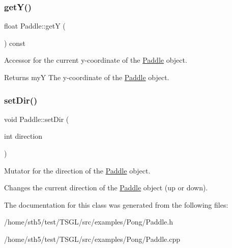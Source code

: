 \subsubsection{\texorpdfstring{get\+Y()}{getY()}}
{\footnotesize\ttfamily float Paddle\+::getY (\begin{DoxyParamCaption}{ }\end{DoxyParamCaption}) const}



Accessor for the current y-\/coordinate of the \hyperlink{class_paddle}{Paddle} object. 

\begin{DoxyReturn}{Returns}
myY The y-\/coordinate of the \hyperlink{class_paddle}{Paddle} object. 
\end{DoxyReturn}
\mbox{\label{class_paddle_a5f23f811b810d1f4a84b25357bc86e94}} 
\subsubsection{\texorpdfstring{set\+Dir()}{setDir()}}
{\footnotesize\ttfamily void Paddle\+::set\+Dir (\begin{DoxyParamCaption}\item[{int}]{direction }\end{DoxyParamCaption})}



Mutator for the direction of the \hyperlink{class_paddle}{Paddle} object. 

Changes the current direction of the \hyperlink{class_paddle}{Paddle} object (up or down). 

The documentation for this class was generated from the following files\+:\begin{DoxyCompactItemize}
\item 
/home/sth5/test/\+T\+S\+G\+L/src/examples/\+Pong/Paddle.\+h\item 
/home/sth5/test/\+T\+S\+G\+L/src/examples/\+Pong/Paddle.\+cpp\end{DoxyCompactItemize}
